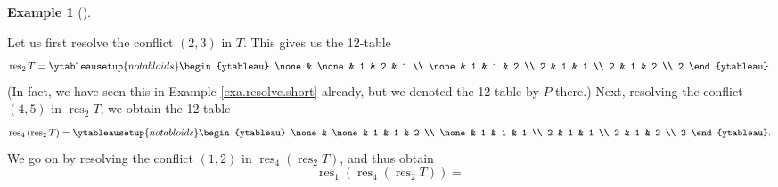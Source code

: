 \documentclass[numbers=enddot,12pt,final,onecolumn,notitlepage]{scrartcl}%
\theoremstyle{definition}
\newtheorem{exmp}[theo]{Example}
\newenvironment{example}[1][]
{\begin{exmp}[#1]\begin{leftbar}}
{\end{leftbar}\end{exmp}}
\newenvironment{vershort}{}{}
\begin{document}
\begin{vershort}
\begin{example}
Let us first resolve the conflict $\left(  2,3\right)  $ in $T$. This gives us
the 12-table%
\[
\operatorname*{res}\nolimits_{2}T=%
\ytableausetup{notabloids}
\begin{ytableau}
\none& \none& 1 & 2 & 1 \\
\none& 1 & 1 & 2 \\
2 & 1 & 1 \\
2 & 1 & 2 \\
2
\end{ytableau}%
.
\]
(In fact, we have seen this in Example \ref{exa.resolve.short} already, but we
denoted the 12-table by $P$ there.) Next, resolving the conflict $\left(
4,5\right)  $ in $\operatorname*{res}\nolimits_{2}T$, we obtain the 12-table%
\[
\operatorname*{res}\nolimits_{4}\left(  \operatorname*{res}\nolimits_{2}%
T\right)  =%
\ytableausetup{notabloids}
\begin{ytableau}
\none& \none& 1 & 1 & 2 \\
\none& 1 & 1 & 1 \\
2 & 1 & 1 \\
2 & 1 & 2 \\
2
\end{ytableau}%
.
\]
We go on by resolving the conflict $\left(  1,2\right)  $ in
$\operatorname*{res}\nolimits_{4}\left(  \operatorname*{res}\nolimits_{2}%
T\right)  $, and thus obtain%
\[
\operatorname*{res}\nolimits_{1}\left(  \operatorname*{res}\nolimits_{4}%
\left(  \operatorname*{res}\nolimits_{2}T\right)  \right)  =%
\]
\end{example}
\end{vershort}
\end{document}
